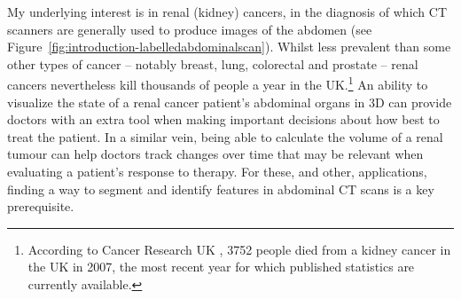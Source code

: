 
My underlying interest is in renal (kidney) cancers, in the diagnosis of which CT scanners are generally used to produce images of the abdomen (see Figure~\ref{fig:introduction-labelledabdominalscan}). Whilst less prevalent than some other types of cancer -- notably breast, lung, colorectal and prostate -- renal cancers nevertheless kill thousands of people a year in the UK.\footnote{According to Cancer Research UK \cite{cruk-kidneycancermortality}, 3752 people died from a kidney cancer in the UK in 2007, the most recent year for which published statistics are currently available.} An ability to visualize the state of a renal cancer patient's abdominal organs in 3D can provide doctors with an extra tool when making important decisions about how best to treat the patient. In a similar vein, being able to calculate the volume of a renal tumour can help doctors track changes over time that may be relevant when evaluating a patient's response to therapy. For these, and other, applications, finding a way to segment and identify features in abdominal CT scans is a key prerequisite.


